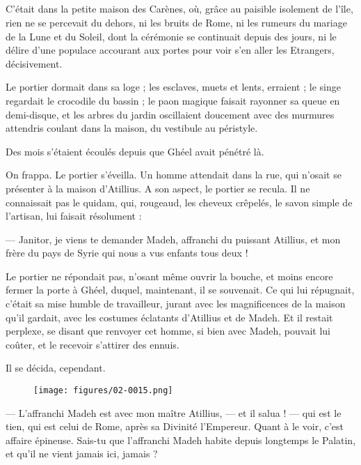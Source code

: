 \documentclass[a4paper, 11pt, oneside, polutonikogreek, french]{article}
\begin{document}
\subsection{}
\paragraph{}
C'était dans la petite maison des Carènes, où, grâce au paisible isolement de l'île, rien ne se percevait du dehors, ni les bruits de Rome, ni les rumeurs du mariage de la Lune et du Soleil, dont la cérémonie se continuait depuis des jours, ni le délire d'une populace accourant aux portes pour voir s'en aller les Etrangers, décisivement.

Le portier dormait dans sa loge ; les esclaves, muets et lents, erraient ; le singe regardait le crocodile du bassin ; le paon magique faisait rayonner sa queue en demi-disque, et les arbres du jardin oscillaient doucement avec des murmures attendris coulant dans la maison, du vestibule au péristyle.

Des mois s'étaient écoulés depuis que Ghéel avait pénétré là.

On frappa. Le portier s'éveilla. Un homme attendait dans la rue, qui n'osait se présenter à la maison d'Atillius. A son aspect, le portier se recula. Il ne connaissait pas le quidam, qui, rougeaud, les cheveux crêpelés, le savon simple de l'artisan, lui faisait résolument :

--- Janitor, je viens te demander Madeh, affranchi du puissant Atillius, et mon frère du pays de Syrie qui nous a vus enfants tous deux !

Le portier ne répondait pas, n'osant même ouvrir la bouche, et moins encore fermer la porte à Ghéel, duquel, maintenant, il se souvenait. Ce qui lui répugnait, c'était sa mise humble de travailleur, jurant avec les magnificences de la maison qu'il gardait, avec les costumes éclatants d'Atillius et de Madeh. Et il restait perplexe, se disant que renvoyer cet homme, si bien avec Madeh, pouvait lui coûter, et le recevoir s'attirer des ennuis.

Il se décida, cependant.
\begin{figure}[H]
\centering
\texttt{[image: figures/02-0015.png]}
\end{figure}
--- L'affranchi Madeh est avec mon maître Atillius, --- et il salua ! --- qui est le tien, qui est celui de Rome, après sa Divinité l'Empereur. Quant à le voir, c'est affaire épineuse. Sais-tu que l'affranchi Madeh habite depuis longtemps le Palatin, et qu'il ne vient jamais ici, jamais ?
\end{document}
